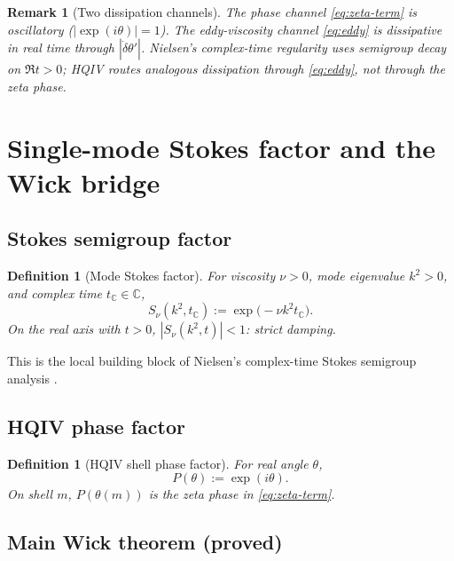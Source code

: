 \documentclass[11pt]{amsart}
\newtheorem{definition}[theorem]{Definition}
\newtheorem{remark}[theorem]{Remark}
\begin{document}
\begin{remark}[Two dissipation channels]
The \emph{phase} channel \eqref{eq:zeta-term} is oscillatory ($|\exp(i\theta)|=1$).
The \emph{eddy-viscosity} channel \eqref{eq:eddy} is dissipative in real time through
$|\dot\delta\theta'|$.
Nielsen's complex-time regularity uses semigroup \emph{decay} on $\Re t>0$; HQIV routes analogous
dissipation through \eqref{eq:eddy}, not through the zeta phase.
\end{remark}

\section{Single-mode Stokes factor and the Wick bridge}
\label{sec:wick}

\subsection{Stokes semigroup factor}

\begin{definition}[Mode Stokes factor]
For viscosity $\nu>0$, mode eigenvalue $k^2>0$, and complex time $t_{\mathbb C}\in\mathbb C$,
\begin{equation}
  S_\nu(k^2,t_{\mathbb C}):=\exp\!\bigl(-\nu k^2 t_{\mathbb C}\bigr).
  \label{eq:stokes-factor}
\end{equation}
On the real axis with $t>0$, $|S_\nu(k^2,t)|<1$: strict damping.
\end{definition}

This is the local building block of Nielsen's complex-time Stokes semigroup analysis
\cite{NielsenSemitaNS2026}.

\subsection{HQIV phase factor}

\begin{definition}[HQIV shell phase factor]
For real angle $\theta$,
\begin{equation}
  P(\theta):=\exp(i\theta).
\end{equation}
On shell $m$, $P(\theta(m))$ is the zeta phase in \eqref{eq:zeta-term}.
\end{definition}

\subsection{Main Wick theorem (proved)}
\end{document}
